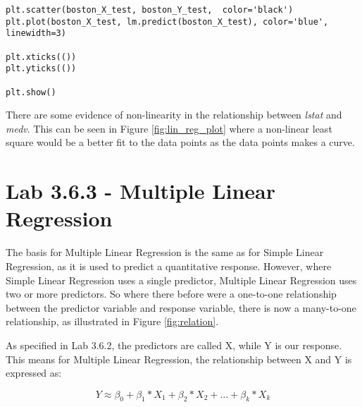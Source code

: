 \begin{lstlisting}[caption={Python Plotting of Linear Regression function}, label=lst:lin_reg_plot, mathescape=true]
plt.scatter(boston_X_test, boston_Y_test,  color='black')
plt.plot(boston_X_test, lm.predict(boston_X_test), color='blue',
linewidth=3)

plt.xticks(())
plt.yticks(())

plt.show()
\end{lstlisting}

There are some evidence of non-linearity in the relationship between \emph{lstat} and \emph{medv}. This can be seen in Figure \ref{fig:lin_reg_plot} where a non-linear least square would be a better fit to the data points as the data points makes a curve. 


\section{Lab 3.6.3 - Multiple Linear Regression}

The basis for Multiple Linear Regression is the same as for Simple Linear Regression, as it is used to predict a quantitative response. However, where Simple Linear Regression uses a single predictor, Multiple Linear Regression uses two or more predictors. So where there before were a one-to-one relationship between the predictor variable and response variable, there is now a many-to-one relationship, as illustrated in Figure \ref{fig:relation}.


As specified in Lab 3.6.2, the predictors are called X, while Y is our response. This means for Multiple Linear Regression, the relationship between X and Y is expressed as:

\begin{equation}
Y \approx \beta_0 + \beta_1 * X_1 + \beta_2 * X_2 + … + \beta_k * X_k
\end{equation}


